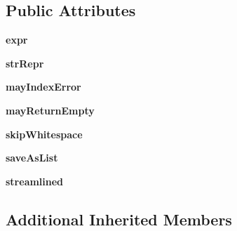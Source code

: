 \subsection*{Public Attributes}
\begin{DoxyCompactItemize}
\item 
\mbox{\label{classpkg__resources_1_1__vendor_1_1pyparsing_1_1_forward_acd61b467cb4c3cfacdf3a20964831388}} 
{\bfseries expr}
\item 
\mbox{\label{classpkg__resources_1_1__vendor_1_1pyparsing_1_1_forward_aac0be0b8632e775a8468c4a8a4a03c79}} 
{\bfseries str\+Repr}
\item 
\mbox{\label{classpkg__resources_1_1__vendor_1_1pyparsing_1_1_forward_a160e4d1d6951b732afab277a35cc57a0}} 
{\bfseries may\+Index\+Error}
\item 
\mbox{\label{classpkg__resources_1_1__vendor_1_1pyparsing_1_1_forward_acf15de1fff6edfeecd33f09dd9e36f95}} 
{\bfseries may\+Return\+Empty}
\item 
\mbox{\label{classpkg__resources_1_1__vendor_1_1pyparsing_1_1_forward_a5c1806cd2166281af7109feaf60d5e62}} 
{\bfseries skip\+Whitespace}
\item 
\mbox{\label{classpkg__resources_1_1__vendor_1_1pyparsing_1_1_forward_a88ce4f7535ac188a6cac66837217d908}} 
{\bfseries save\+As\+List}
\item 
\mbox{\label{classpkg__resources_1_1__vendor_1_1pyparsing_1_1_forward_a428d754593cf9ba57429f411a6e92a6f}} 
{\bfseries streamlined}
\end{DoxyCompactItemize}
\subsection*{Additional Inherited Members}



